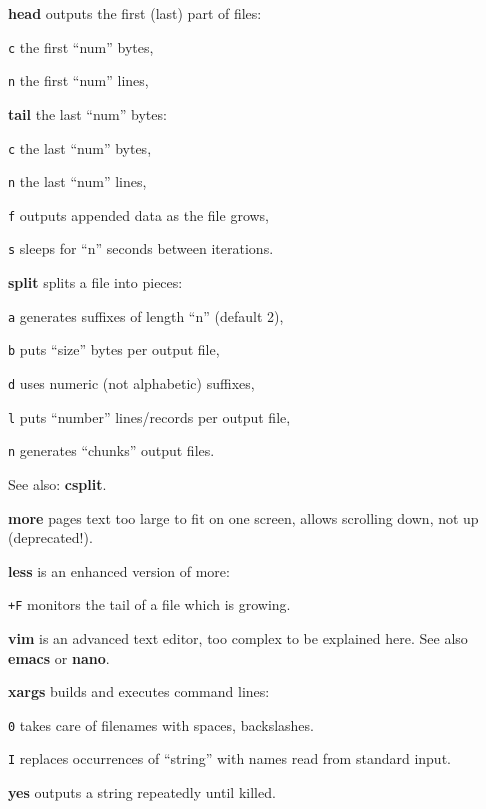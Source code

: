 \begin{compactenum}
	\item [\cmdcore] \textbf{head} outputs the first (last) part of files:
	\item [\texttt{c}] the first ``num'' bytes,
	\item [\texttt{n}] the first ``num'' lines,
	\item [\cmdcore] \textbf{tail} the last ``num'' bytes:
	\item [\texttt{c}] the last ``num'' bytes,
	\item [\texttt{n}] the last ``num'' lines,
	\item [\texttt{f}] outputs appended data as the file grows,
	\item [\texttt{s}] sleeps for ``n'' seconds between iterations. 
	\item [\cmdcore] \textbf{split} splits a file into pieces:
	\item [\texttt{a}] generates suffixes of length ``n'' (default 2),
	\item [\texttt{b}] puts ``size'' bytes per output file,
	\item [\texttt{d}] uses numeric (not alphabetic) suffixes,
	\item [\texttt{l}] puts ``number'' lines/records per output file,
	\item [\texttt{n}] generates ``chunks'' output files.
	\item [\cmdcore] See also: \textbf{csplit}.
\end{compactenum}

\begin{compactenum}
	\item [\cmdvar] \textbf{more} pages text too large to fit on one screen, allows scrolling down, not up (deprecated!).
	\item [\cmdvar] \textbf{less} is an enhanced version of more:
	\item [\texttt{+F}] monitors the tail of a file which is growing.
\end{compactenum}

\begin{compactenum}
	\item [\cmdvar] \textbf{vim} is an advanced text editor, 
	too complex to be explained here.
	See also \textbf{emacs} or \textbf{nano}.
\end{compactenum}

\begin{compactenum}
	\item [\cmdvar] \textbf{xargs} builds and executes command lines:
	\item [\texttt{0}] takes care of filenames with spaces, backslashes.
	\item [\texttt{I}] replaces occurrences of ``string'' with names read from standard input.
\end{compactenum}

\begin{compactenum}
	\item [\cmdvar] \textbf{yes} outputs a string repeatedly until killed.
\end{compactenum}
